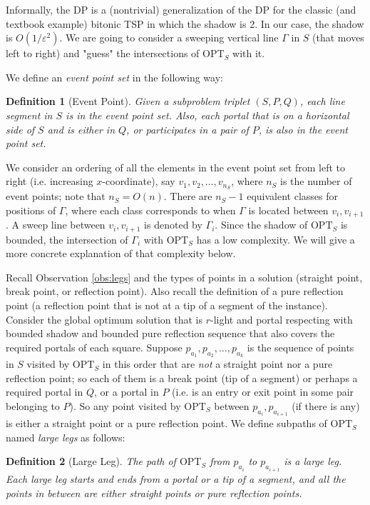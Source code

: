 \documentclass[10pt,a4paper]{amsart}
\theoremstyle{thmstyleone}
\newtheorem{definition}{Definition} %
\newcommand{\eps}{\varepsilon}
\newcommand{\OPT}{{\text{OPT}}}
\begin{document}
Informally, the DP is a (nontrivial) generalization of the DP for the classic (and textbook example) bitonic TSP in which the shadow is 2. In our case, the shadow is $O(1/\eps^2)$.
We are going to consider a sweeping vertical line $\Gamma$ in $S$ (that moves left to right) and "guess" the intersections of $\OPT_S$ with it. 

We define an {\em event point set} in the following way:
\begin{definition}[Event Point]
	Given a subproblem triplet $ (S, P, Q) $, each line segment in $S$ is in the event point set. Also, each portal that is on a horizontal side of $S$
	and is either in $Q$, or participates in a pair of $P$, is also in the event point set.
\end{definition}
We consider an ordering of all the elements in the event point set from left to right (i.e. increasing $x$-coordinate), say $v_1,v_2,\ldots,v_{n_S}$, where $n_S$ is the number of event points; note that $n_S=O(n)$.
There are $n_S - 1$ equivalent classes for positions of $\Gamma$, where each class corresponds to when $\Gamma$ is located between $v_i,v_{i+1}$. A sweep line between $v_i,v_{i+1}$ is denoted by $\Gamma_i$.
Since the shadow of $\OPT_S$ is bounded, the intersection of $\Gamma_i$ with $\OPT_S$ has a low complexity. We will give a more concrete explanation of that complexity below.

Recall Observation \ref{obs:legs} and the types of points in a solution (straight point, break point, or reflection point). Also recall the definition of a pure reflection point (a reflection point that  is not
at a tip of a segment of the instance). Consider the global optimum solution that is $r$-light and portal respecting with bounded shadow
and bounded pure reflection sequence that also covers the required portals of each square.
Suppose $p_{a_1},p_{a_2},\ldots,p_{a_k}$ is the sequence of points in $S$ visited by $\OPT_S$ in this order that are 
{\em not} a straight point nor a pure reflection point; so each of them is a break point (tip of a segment) or perhaps a required portal in $Q$, or a portal in $ P $ (i.e. is an entry or exit point in some pair belonging to $ P $).
So any point visited by $\OPT_S$ between $p_{a_i},p_{a_{i+1}}$ (if there is any) is either a straight point
or a pure reflection point. We define subpaths of $ \OPT_S $ named {\em large legs} as follows:

\begin{definition}[Large Leg]
	The path of $ \OPT_S $ from $p_{a_i}$ to $p_{a_{i+1}}$ is a large leg. Each large leg starts and ends from a portal or a tip of a segment, and all the points in between are either straight points or pure reflection points.
\end{definition}
\end{document}
